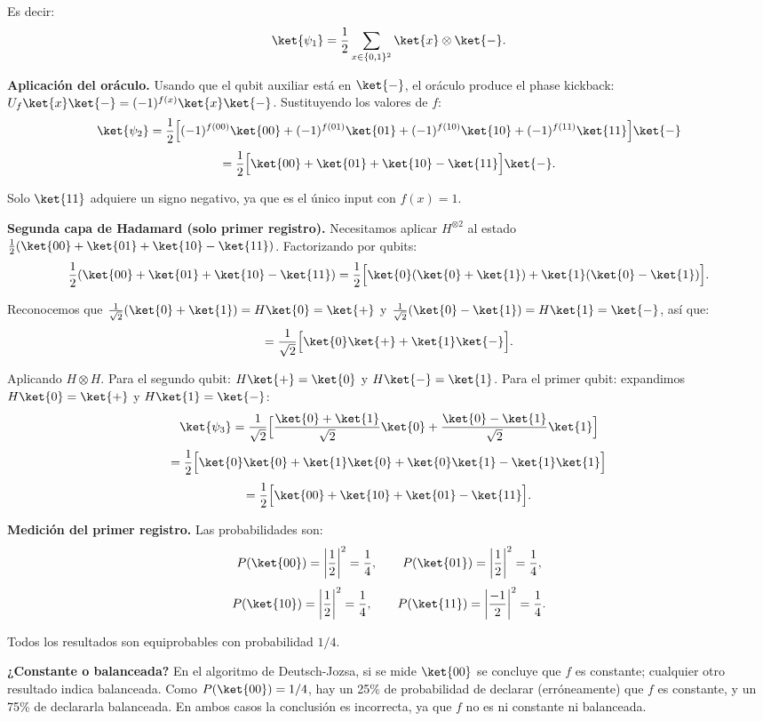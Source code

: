 Es decir:
$$
    \ket{\psi_1} = \frac{1}{2}\sum_{x \in \{0,1\}^2} \ket{x} \otimes \ket{-}.
$$

\textbf{Aplicación del oráculo.} Usando que el qubit auxiliar está en $\ket{-}$, el oráculo produce el phase kickback: $U_f\ket{x}\ket{-} = (-1)^{f(x)}\ket{x}\ket{-}$. Sustituyendo los valores de $f$:
$$
    \ket{\psi_2} = \frac{1}{2}\Big[(-1)^{f(00)}\ket{00} + (-1)^{f(01)}\ket{01} + (-1)^{f(10)}\ket{10} + (-1)^{f(11)}\ket{11}\Big]\ket{-}
$$
$$
    = \frac{1}{2}\Big[\ket{00} + \ket{01} + \ket{10} - \ket{11}\Big]\ket{-}.
$$

Solo $\ket{11}$ adquiere un signo negativo, ya que es el único input con $f(x)=1$.

\textbf{Segunda capa de Hadamard (solo primer registro).} Necesitamos aplicar $H^{\otimes 2}$ al estado $\frac{1}{2}(\ket{00}+\ket{01}+\ket{10}-\ket{11})$. Factorizando por qubits:
$$
    \frac{1}{2}(\ket{00}+\ket{01}+\ket{10}-\ket{11}) = \frac{1}{2}\Big[\ket{0}(\ket{0}+\ket{1}) + \ket{1}(\ket{0}-\ket{1})\Big].
$$

Reconocemos que $\frac{1}{\sqrt{2}}(\ket{0}+\ket{1}) = H\ket{0} = \ket{+}$ y $\frac{1}{\sqrt{2}}(\ket{0}-\ket{1}) = H\ket{1} = \ket{-}$, así que:
$$
    = \frac{1}{\sqrt{2}}\Big[\ket{0}\ket{+} + \ket{1}\ket{-}\Big].
$$

Aplicando $H \otimes H$. Para el segundo qubit: $H\ket{+} = \ket{0}$ y $H\ket{-} = \ket{1}$. Para el primer qubit: expandimos $H\ket{0} = \ket{+}$ y $H\ket{1} = \ket{-}$:
$$
    \ket{\psi_3} = \frac{1}{\sqrt{2}}\Big[\frac{\ket{0}+\ket{1}}{\sqrt{2}}\ket{0} + \frac{\ket{0}-\ket{1}}{\sqrt{2}}\ket{1}\Big]
$$
$$
    = \frac{1}{2}\Big[\ket{0}\ket{0} + \ket{1}\ket{0} + \ket{0}\ket{1} - \ket{1}\ket{1}\Big]
$$
$$
    = \frac{1}{2}\Big[\ket{00} + \ket{10} + \ket{01} - \ket{11}\Big].
$$

\textbf{Medición del primer registro.} Las probabilidades son:
$$
    P(\ket{00}) = \left|\frac{1}{2}\right|^2 = \frac{1}{4}, \qquad P(\ket{01}) = \left|\frac{1}{2}\right|^2 = \frac{1}{4},
$$
$$
    P(\ket{10}) = \left|\frac{1}{2}\right|^2 = \frac{1}{4}, \qquad P(\ket{11}) = \left|\frac{-1}{2}\right|^2 = \frac{1}{4}.
$$

Todos los resultados son equiprobables con probabilidad $1/4$.

\vspace{0.3cm}

\textbf{¿Constante o balanceada?} En el algoritmo de Deutsch-Jozsa, si se mide $\ket{00}$ se concluye que $f$ es constante; cualquier otro resultado indica balanceada. Como $P(\ket{00}) = 1/4$, hay un 25\% de probabilidad de declarar (erróneamente) que $f$ es constante, y un 75\% de declararla balanceada. En ambos casos la conclusión es incorrecta, ya que $f$ no es ni constante ni balanceada.

